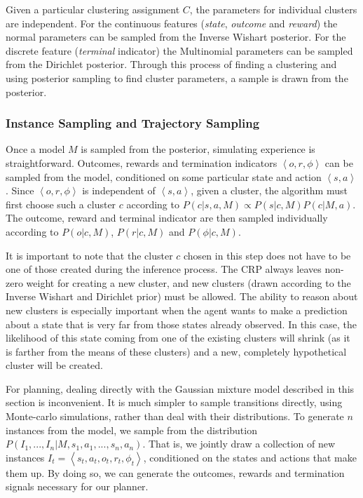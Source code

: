 Given a particular clustering assignment $C$, the parameters for individual clusters are independent. For the continuous features (\emph{state}, \emph{outcome} and \emph{reward}) the normal parameters can be sampled from the Inverse Wishart posterior. For the discrete feature (\emph{terminal} indicator) the Multinomial parameters can be sampled from the Dirichlet posterior. Through this process of finding a clustering and using posterior sampling to find cluster parameters, a sample is drawn from the  posterior.

\subsubsection{Instance Sampling and Trajectory Sampling}

Once a model $M$ is sampled from the  posterior, simulating experience is straightforward. Outcomes, rewards and termination indicators $\left<o,r,\phi\right>$ can be sampled from the model, conditioned on some particular state and action $\left<s,a\right>$. Since $\left<o,r,\phi\right>$ is independent of $\left<s,a\right>$, given a cluster, the algorithm must first choose such a cluster $c$ according to $P(c|s,a,M)\propto P(s|c,M)P(c|M,a)$. The outcome, reward and terminal indicator are then sampled individually according to $P(o|c,M)$, $P(r|c,M)$ and $P(\phi|c,M)$.

It is important to note that the cluster $c$ chosen in this step does not have to be one of those created during the inference process. The CRP always leaves non-zero weight for creating a new cluster, and new clusters (drawn according to the Inverse Wishart and Dirichlet prior) must be allowed. The ability to reason about new clusters is especially important when the agent wants to make a prediction about a state that is very far from those states already observed. In this case, the likelihood of this state coming from one of the existing clusters will shrink (as it is farther from the means of these clusters) and a new, completely hypothetical cluster will be created.

For planning, dealing directly with the Gaussian mixture model described in this section is inconvenient. It is much simpler to sample transitions directly, using Monte-carlo simulations, rather than deal with their distributions. To generate $n$ instances from the model, we sample from the distribution $P(I_1,...,I_n|M,s_1,a_1,...,s_n,a_n)$. That is, we jointly draw a collection of new instances $I_t=\left<s_t,a_t,o_t,r_t,\phi_t\right>$, conditioned on the states and actions that make them up. By doing so, we can generate the outcomes, rewards and termination signals necessary for our planner.

